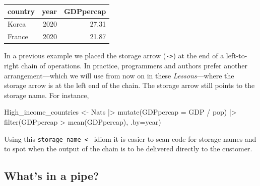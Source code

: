 \documentclass[
  letterpaper,
  DIV=11,
  numbers=noendperiod,
  oneside]{scrartcl}
\newenvironment{Shaded}{\begin{snugshade}}{\end{snugshade}}
\newcommand{\AttributeTok}[1]{\textcolor[rgb]{0.40,0.45,0.13}{#1}}
\newcommand{\FunctionTok}[1]{\textcolor[rgb]{0.28,0.35,0.67}{#1}}
\newcommand{\NormalTok}[1]{\textcolor[rgb]{0.00,0.23,0.31}{#1}}
\newcommand{\OtherTok}[1]{\textcolor[rgb]{0.00,0.23,0.31}{#1}}
\newcommand{\SpecialCharTok}[1]{\textcolor[rgb]{0.37,0.37,0.37}{#1}}
\begin{document}
\begin{tabular}{l|r|r}
\hline
country & year & GDPpercap\\
\hline
Korea & 2020 & 27.31\\
\hline
France & 2020 & 21.87\\
\hline
\end{tabular}

\begin{tcolorbox}[enhanced jigsaw, colbacktitle=quarto-callout-note-color!10!white, opacityback=0, breakable, opacitybacktitle=0.6, colback=white, coltitle=black, arc=.35mm, title=\textcolor{quarto-callout-note-color}{\faInfo}\hspace{0.5em}{Pointing out storage from the start}, left=2mm, colframe=quarto-callout-note-color-frame, rightrule=.15mm, bottomrule=.15mm, leftrule=.75mm, bottomtitle=1mm, toptitle=1mm, titlerule=0mm, toprule=.15mm]

In a previous example we placed the storage arrow
(\texttt{-\textgreater{}}) at the end of a left-to-right chain of
operations. In practice, programmers and authors prefer another
arrangement---which we will use from now on in these
\emph{Lessons}---where the storage arrow is at the left end of the
chain. The storage arrow still points to the storage name. For instance,

\begin{Shaded}
\begin{Highlighting}[]
\NormalTok{High\_income\_countries }\OtherTok{\textless{}{-}}\NormalTok{ Nats }\SpecialCharTok{|\textgreater{}}
  \FunctionTok{mutate}\NormalTok{(}\AttributeTok{GDPpercap =}\NormalTok{ GDP }\SpecialCharTok{/}\NormalTok{ pop) }\SpecialCharTok{|\textgreater{}}
  \FunctionTok{filter}\NormalTok{(GDPpercap }\SpecialCharTok{\textgreater{}} \FunctionTok{mean}\NormalTok{(GDPpercap), }\AttributeTok{.by=}\NormalTok{year) }
\end{Highlighting}
\end{Shaded}

Using this \texttt{storage\_name\ \textless{}-} idiom it is easier to
scan code for storage names and to spot when the output of the chain is
to be delivered directly to the customer.

\end{tcolorbox}

\subsection{What's in a pipe?}\label{whats-in-a-pipe}
\end{document}
